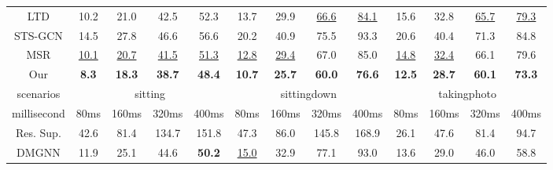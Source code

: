 \begin{table}[t]
{\begin{tabular}{c|cccc|cccc|cccc}
    LTD         & 10.2          & 21.0          & 42.5          & 52.3          & 13.7          & 29.9          & \underline{66.6}    & \underline{84.1}    & 15.6          & 32.8          & \underline{65.7}    & \underline{79.3}    \\
    STS-GCN      & 14.5          & 27.8          & 46.6          & 56.6          & 20.2          & 40.9          & 75.5          & 93.3          & 20.6          & 40.4          & 71.3          & 84.8          \\
    MSR         & \underline{10.1}    & \underline{20.7}    & \underline{41.5}    & \underline{51.3}    & \underline{12.8}    & \underline{29.4}    & 67.0          & 85.0          & \underline{14.8}    & \underline{32.4}    & 66.1          & 79.6          \\
    Our         & \textbf{8.3}  & \textbf{18.3} & \textbf{38.7} & \textbf{48.4} & \textbf{10.7} & \textbf{25.7} & \textbf{60.0} & \textbf{76.6} & \textbf{12.5} & \textbf{28.7} & \textbf{60.1} & \textbf{73.3} \\ \hline
    scenarios   & \multicolumn{4}{c|}{sitting}                                   & \multicolumn{4}{c|}{sittingdown}                               & \multicolumn{4}{c}{takingphoto}                               \\ \hline
    millisecond & 80ms          & 160ms         & 320ms         & 400ms         & 80ms          & 160ms         & 320ms         & 400ms         & 80ms          & 160ms         & 320ms         & 400ms         \\ \hline
    Res. Sup.   & 42.6          & 81.4          & 134.7         & 151.8         & 47.3          & 86.0          & 145.8         & 168.9         & 26.1          & 47.6          & 81.4          & 94.7          \\
    DMGNN       & 11.9          & 25.1          & 44.6          & \textbf{50.2} & \underline{15.0}    & 32.9          & 77.1          & 93.0          & 13.6          & 29.0          & 46.0          & 58.8          \\
    

\end{tabular}}
\end{table}
